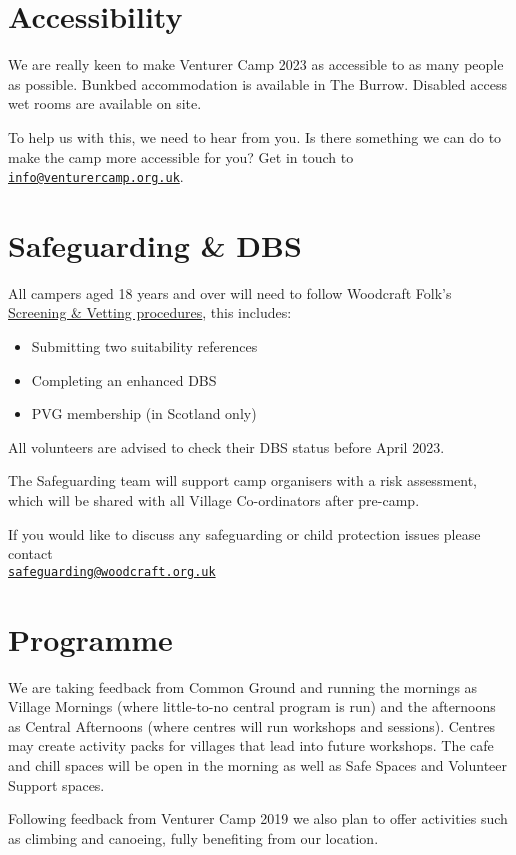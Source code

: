 \documentclass[a4paper, 10pt]{report}
\begin{document}
\chapter{Accessibility}
We are really keen to make Venturer Camp 2023 as accessible to as many people as possible. Bunkbed accommodation is available in The Burrow. Disabled access wet rooms are available on site.

To help us with this, we need to hear from you. Is there something we can do to make the camp more accessible for you? Get in touch to \href{mailto:info@venturercamp.org.uk}{\texttt{info@venturercamp.org.uk}}.

\chapter{Safeguarding \& DBS}
All campers aged 18 years and over will need to follow Woodcraft Folk's \href{https://woodcraft.org.uk/resources/volunteer-screening/}{Screening \& Vetting procedures}, this includes:
\begin{itemize}
    \item Submitting two suitability references
    \item Completing an enhanced DBS
    \item PVG membership (in Scotland only)
\end{itemize}
All volunteers are advised to check their DBS status before April 2023.

The Safeguarding team will support camp organisers with a risk assessment, which will be shared with all Village Co-ordinators after pre-camp.

If you would like to discuss any safeguarding or child protection issues please contact\\ \href{mailto:safeguarding@woodcraft.org.uk}{\texttt{safeguarding@woodcraft.org.uk}}

\chapter{Programme}
We are taking feedback from Common Ground and running the mornings as Village Mornings (where little-to-no central program is run) and the afternoons as Central Afternoons (where centres will run workshops and sessions). Centres may create activity packs for villages that lead into future workshops. The cafe and chill spaces will be open in the morning as well as Safe Spaces and Volunteer Support spaces. 

Following feedback from Venturer Camp 2019 we also plan to offer activities such as climbing and canoeing, fully benefiting from our location. 
\end{document}
